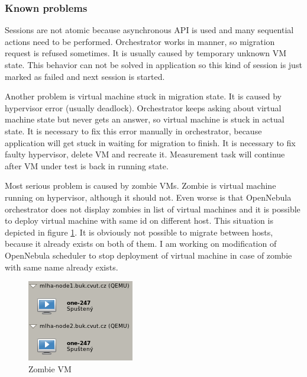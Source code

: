 \subsubsection{Known problems}

Sessions are not atomic because asynchronous \Ac{API} is used and many sequential actions need to be performed. Orchestrator works in  manner, so migration request is refused sometimes. It is usually caused by temporary unknown \Ac{VM} state. This behavior can not be solved in application so this kind of session is just marked as failed and next session is started. 

Another problem is virtual machine stuck in migration state. It is caused by hypervisor error (usually deadlock). Orchestrator keeps asking about virtual machine state but never gets an answer, so virtual machine is stuck in actual state. It is necessary to fix this error manually in orchestrator, because application will get stuck in waiting for migration to finish. It is necessary to fix faulty hypervisor, delete \Ac{VM} and recreate it.
Measurement task will continue after \Ac{VM} under test is back in running state.

Most serious problem is caused by zombie \Ac{VM}s. Zombie is virtual machine running on hypervisor, although it should not. Even worse is that OpenNebula orchestrator does not display zombies in list of virtual machines and it is possible to deploy virtual machine with same id on different host. This situation is depicted in figure \ref{img:themis-zombie}. It is obviously not possible to migrate  between hosts, because it already exists on both of them. I am working on modification of OpenNebula scheduler to stop deployment of virtual machine in case of zombie with same name already exists.

\begin{figure}[htb]
	\begin{center}
	\includegraphics[scale=0.8]{zombie.png}
	\end{center}
	\caption{Zombie \Ac{VM}}
	\label{img:themis-zombie}
\end{figure}

